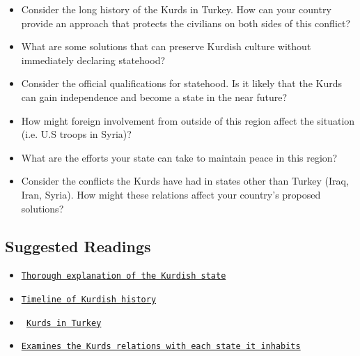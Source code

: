 \documentclass[10pt, letterpaper]{article}
\begin{document}
\begin{itemize}
\item
  
  Consider the long history of the Kurds in Turkey. How can your country
  provide an approach that protects the civilians on both sides of this
  conflict?
  
\item
  
  What are some solutions that can preserve Kurdish culture without
  immediately declaring statehood?
  
\item
  
  Consider the official qualifications for statehood. Is it likely that
  the Kurds can gain independence and become a state in the near future?
  
\item
  
  How might foreign involvement from outside of this region affect the
  situation (i.e. U.S troops in Syria)?
  
\item
  
  What are the efforts your state can take to maintain peace in this
  region?
  
\item
  
  Consider the conflicts the Kurds have had in states other than Turkey
  (Iraq, Iran, Syria). How might these relations affect your country's
  proposed solutions?
  
\end{itemize}

\subsection{Suggested Readings}

\begin{itemize}
\item
  
  
  \texttt{\href{https://thekurdishproject.org/}{Thorough explanation of the Kurdish state}}
  
\item
  
  
  \texttt{\href{https://www.cfr.org/timeline/kurds-quest-independence}{{Timeline of Kurdish history}}}
  
\item
  
  \texttt{
  \href{https://www.culturalsurvival.org/publications/cultural-survival-quarterly/kurdish-repression-turkey}{{Kurds in Turkey}}}
  
\item
  
  
  \texttt{\href{https://www.crisisgroup.org/middle-east-north-africa/gulf-and-arabian-peninsula/iraq/kurds-divided-future}{{Examines the Kurds relations with each state it inhabits}}}
  
\end{itemize}
\end{document}
